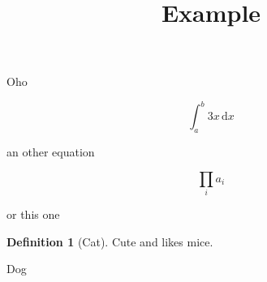 \documentclass{amsart}
\theoremstyle{definition}
\newtheorem{definition}[theorem]{Definition}
\theoremstyle{remark}
\numberwithin{equation}{section}
\begin{document}
\title{Example}
\maketitle

Oho

\[
	\int_{a}^{b} 3x \, \mathrm{d}x
\]

an other equation

\begin{equation}
	\prod_{i} a_{i}
\end{equation}

or this one

\begin{definition}[Cat]
	Cute and likes mice.
\end{definition}

\begin{center}
	Dog
\end{center}
\end{document}

